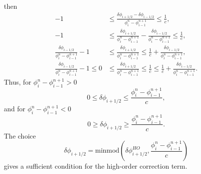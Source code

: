 \documentclass[../thesis.tex]{subfiles}
\begin{document}
then
\begin{equation}
    \begin{split}
        -1
        &\leq
        \frac{\delta \phi_{i+1/2} - \delta \phi_{i-1/2}}
        {\phi_{i}^{n} - \phi_{i-1}^{n+1}}
        \leq
        \frac{1}{c},
        \\
        -1
        &\leq
        \frac{\delta \phi_{i+1/2}}
        {\phi_{i}^{n} - \phi_{i-1}^{n+1}}
        -\frac{\delta \phi_{i-1/2}}
        {\phi_{i}^{n} - \phi_{i-1}^{n+1}}
        \leq
        \frac{1}{c},
        \\
        \frac{\delta \phi_{i-1/2}}
        {\phi_{i}^{n} - \phi_{i-1}^{n+1}}-1
        &\leq
        \frac{\delta \phi_{i+1/2}}
        {\phi_{i}^{n} - \phi_{i-1}^{n+1}}
        \leq
        \frac{1}{c}
        +\frac{\delta \phi_{i-1/2}}
        {\phi_{i}^{n} - \phi_{i-1}^{n+1}},
        \\
        \frac{\delta \phi_{i-1/2}}
        {\phi_{i}^{n} - \phi_{i-1}^{n+1}}-1
        \leq
        0
        &\leq
        \frac{\delta \phi_{i+1/2}}
        {\phi_{i}^{n} - \phi_{i-1}^{n+1}}
        \leq
        \frac{1}{c}
        \leq
        \frac{1}{c}
        +\frac{\delta \phi_{i-1/2}}
        {\phi_{i}^{n} - \phi_{i-1}^{n+1}}.
    \end{split}
\end{equation}
Thus, for \(\phi_{i}^{n} - \phi_{i-1}^{n+1} > 0\)
\begin{equation}
    0
    \leq
    \delta \phi_{i+1/2}
    \leq
    \frac{\phi_{i}^{n} - \phi_{i-1}^{n+1}}{c},
\end{equation}
and for \(\phi_{i}^{n} - \phi_{i-1}^{n+1} < 0\)
\begin{equation}
    0
    \geq
    \delta \phi_{i+1/2}
    \geq
    \frac{\phi_{i}^{n} - \phi_{i-1}^{n+1}}{c}.
\end{equation}
The choice
\begin{equation}
    \delta \phi_{i+1/2} = \mbox{minmod}\left(
        \delta \phi_{i+1/2}^{HO},
        \frac{\phi_{i}^{n} - \phi_{i-1}^{n+1}}{c}
    \right)
\end{equation}
gives a sufficient condition for the high-order correction term.
\end{document}
